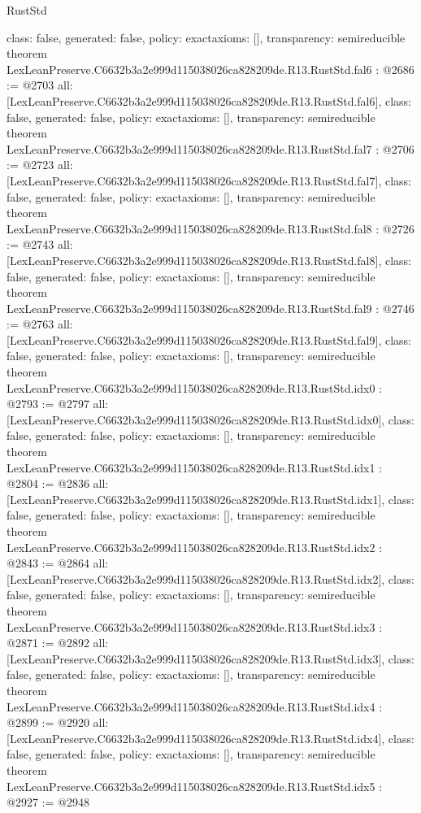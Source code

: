 \begin{lexlean}{RustStd}
\begin{coremodule}
{  class: false,
  generated: false,
  policy: exact{axioms: []},
  transparency: semireducible
}
theorem LexLeanPreserve.C6632b3a2e999d115038026ca828209de.R13.RustStd.fal6 : @2686 := @2703 {
  all: [LexLeanPreserve.C6632b3a2e999d115038026ca828209de.R13.RustStd.fal6],
  class: false,
  generated: false,
  policy: exact{axioms: []},
  transparency: semireducible
}
theorem LexLeanPreserve.C6632b3a2e999d115038026ca828209de.R13.RustStd.fal7 : @2706 := @2723 {
  all: [LexLeanPreserve.C6632b3a2e999d115038026ca828209de.R13.RustStd.fal7],
  class: false,
  generated: false,
  policy: exact{axioms: []},
  transparency: semireducible
}
theorem LexLeanPreserve.C6632b3a2e999d115038026ca828209de.R13.RustStd.fal8 : @2726 := @2743 {
  all: [LexLeanPreserve.C6632b3a2e999d115038026ca828209de.R13.RustStd.fal8],
  class: false,
  generated: false,
  policy: exact{axioms: []},
  transparency: semireducible
}
theorem LexLeanPreserve.C6632b3a2e999d115038026ca828209de.R13.RustStd.fal9 : @2746 := @2763 {
  all: [LexLeanPreserve.C6632b3a2e999d115038026ca828209de.R13.RustStd.fal9],
  class: false,
  generated: false,
  policy: exact{axioms: []},
  transparency: semireducible
}
theorem LexLeanPreserve.C6632b3a2e999d115038026ca828209de.R13.RustStd.idx0 : @2793 := @2797 {
  all: [LexLeanPreserve.C6632b3a2e999d115038026ca828209de.R13.RustStd.idx0],
  class: false,
  generated: false,
  policy: exact{axioms: []},
  transparency: semireducible
}
theorem LexLeanPreserve.C6632b3a2e999d115038026ca828209de.R13.RustStd.idx1 : @2804 := @2836 {
  all: [LexLeanPreserve.C6632b3a2e999d115038026ca828209de.R13.RustStd.idx1],
  class: false,
  generated: false,
  policy: exact{axioms: []},
  transparency: semireducible
}
theorem LexLeanPreserve.C6632b3a2e999d115038026ca828209de.R13.RustStd.idx2 : @2843 := @2864 {
  all: [LexLeanPreserve.C6632b3a2e999d115038026ca828209de.R13.RustStd.idx2],
  class: false,
  generated: false,
  policy: exact{axioms: []},
  transparency: semireducible
}
theorem LexLeanPreserve.C6632b3a2e999d115038026ca828209de.R13.RustStd.idx3 : @2871 := @2892 {
  all: [LexLeanPreserve.C6632b3a2e999d115038026ca828209de.R13.RustStd.idx3],
  class: false,
  generated: false,
  policy: exact{axioms: []},
  transparency: semireducible
}
theorem LexLeanPreserve.C6632b3a2e999d115038026ca828209de.R13.RustStd.idx4 : @2899 := @2920 {
  all: [LexLeanPreserve.C6632b3a2e999d115038026ca828209de.R13.RustStd.idx4],
  class: false,
  generated: false,
  policy: exact{axioms: []},
  transparency: semireducible
}
theorem LexLeanPreserve.C6632b3a2e999d115038026ca828209de.R13.RustStd.idx5 : @2927 := @2948 {
}
\end{coremodule}
\end{lexlean}
